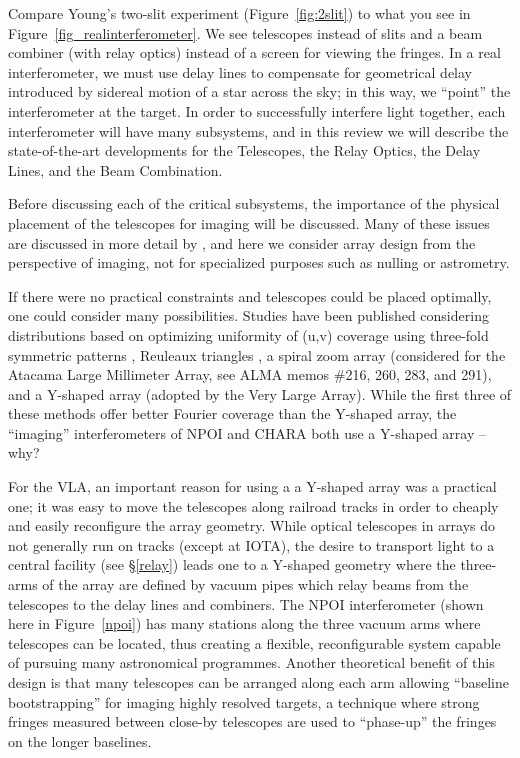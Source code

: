 \documentclass[12pt]{article}
\begin{document}
Compare Young's two-slit experiment (Figure~\ref{fig:2slit}) to what
you see in Figure~\ref{fig_realinterferometer}.  We see telescopes
instead of slits and a beam combiner (with relay optics) instead of a
screen for viewing the fringes.  In a real interferometer, we must use
delay lines to compensate for geometrical delay introduced by sidereal
motion of a star across the sky; in this way, we ``point'' the
interferometer at the target.
In order to successfully interfere light together, each interferometer will
have many subsystems, and in this review we will describe the
state-of-the-art developments for the
Telescopes, the Relay Optics, the Delay Lines,
and the Beam Combination.

\label{arraydesign}
Before discussing each of the critical subsystems, the importance of
the physical placement of the telescopes for imaging will be
discussed.  Many of these issues are discussed in more detail by
\citet{mozurk2000}, and here we consider array design from the
perspective of imaging, not for specialized purposes such as nulling
or astrometry.

If there were no practical constraints and telescopes could be placed
optimally, one could consider many possibilities.  Studies have been
published considering distributions based on optimizing uniformity of
(u,v) coverage using three-fold symmetric patterns \citep[used in Keck
aperture masking,][]{golay71}, Reuleaux triangles \citep[used for the
Sub-Millimeter Array,][]{keto1997}, a spiral zoom array (considered
for the Atacama Large Millimeter Array, see ALMA memos \#216, 260,
283, and 291), and a Y-shaped array (adopted by the Very Large Array).
While the first three of these methods offer better Fourier coverage
than the Y-shaped array, the ``imaging'' interferometers of NPOI and
CHARA both use a Y-shaped array -- why?

For the VLA, an important reason for using a a Y-shaped array was a
practical one; it was easy to move the telescopes along railroad
tracks in order to cheaply and easily reconfigure the array geometry.
While optical telescopes in arrays do not generally run on tracks
(except at IOTA), the desire to transport light to a central facility
(see \S\ref{relay}) leads one to a Y-shaped geometry where the
three-arms of the array are defined by vacuum pipes which relay beams
from the telescopes to the delay lines and combiners.  The NPOI
interferometer (shown here in Figure~\ref{npoi}) has many stations
along the three vacuum arms where telescopes can be located, thus
creating a flexible, reconfigurable system capable of pursuing many
astronomical programmes. Another theoretical benefit of this design is
that many telescopes can be arranged along each arm allowing
``baseline bootstrapping'' for imaging highly resolved targets, a
technique where strong fringes measured between close-by telescopes
are used to ``phase-up'' the fringes on the longer baselines.
\end{document}
